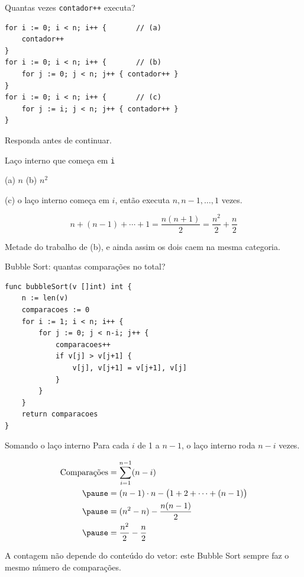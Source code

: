 \documentclass{beamer}
\begin{document}
\begin{frame}[fragile]{Quantas vezes \texttt{contador++} executa?}
	\begin{verbatim}
for i := 0; i < n; i++ {       // (a)
    contador++
}
for i := 0; i < n; i++ {       // (b)
    for j := 0; j < n; j++ { contador++ }
}
for i := 0; i < n; i++ {       // (c)
    for j := i; j < n; j++ { contador++ }
}
  \end{verbatim}
	\begin{center}
		Responda antes de continuar.
	\end{center}
\end{frame}

\begin{frame}{Laço interno que começa em \texttt{i}}
	\begin{center}
		(a) $n$ \qquad (b) $n^2$
	\end{center}

	\pause

	\vspace{0.4cm}
	(c) o laço interno começa em $i$, então executa $n, n-1, \dots, 1$ vezes.

	$$n + (n-1) + \cdots + 1 = \frac{n(n+1)}{2} = \frac{n^2}{2} + \frac{n}{2}$$

	\vspace{0.3cm}
	Metade do trabalho de (b), e ainda assim os dois caem na mesma categoria.
\end{frame}

\begin{frame}[fragile]{Bubble Sort: quantas comparações no total?}
	\begin{verbatim}
func bubbleSort(v []int) int {
    n := len(v)
    comparacoes := 0
    for i := 1; i < n; i++ {
        for j := 0; j < n-i; j++ {
            comparacoes++
            if v[j] > v[j+1] {
                v[j], v[j+1] = v[j+1], v[j]
            }
        }
    }
    return comparacoes
}
  \end{verbatim}
\end{frame}

\begin{frame}{Somando o laço interno}
	Para cada $i$ de 1 a $n-1$, o laço interno roda $n-i$ vezes.

	\pause
	$$
		\begin{aligned}
			\text{Comparações} & = \sum_{i=1}^{n-1} (n-i)                           \\
			\pause
			                   & = (n-1) \cdot n - \big(1 + 2 + \cdots + (n-1)\big) \\
			\pause
			                   & = (n^2-n) - \frac{n(n-1)}{2}                       \\
			\pause
			                   & = \frac{n^2}{2} - \frac{n}{2}
		\end{aligned}
	$$

	\vspace{0.2cm}
	\pause
	\footnotesize A contagem não depende do conteúdo do vetor: este Bubble Sort
	sempre faz o mesmo número de comparações.
\end{frame}
\end{document}
